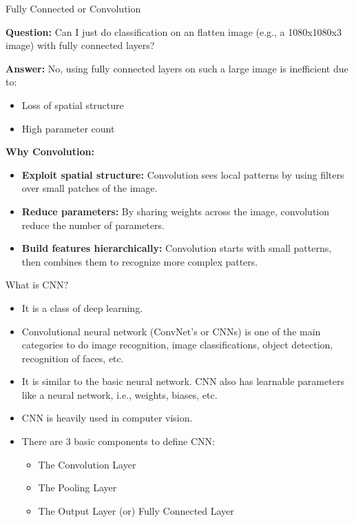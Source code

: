 \documentclass[serif, aspectratio=169]{beamer}
\begin{document}
	\begin{frame}{Fully Connected or Convolution}
		
		\textbf{Question:}
		Can I just do classification on an flatten image (e.g., a 1080x1080x3 image) with fully connected layers?
		
		\bigskip
		
		\textbf{Answer:} 
		No, using fully connected layers on such a large image is inefficient due to:
		\begin{itemize}
			\item Loss of spatial structure
			\item High parameter count
		\end{itemize}
		
		\bigskip
		
		\textbf{Why Convolution:}
			\begin{itemize}
				\item \textbf{Exploit spatial structure:} Convolution sees local patterns by using filters over small patches of the image.
				\item \textbf{Reduce parameters:} By sharing weights across the image, convolution reduce the number of parameters.
				\item \textbf{Build features hierarchically:} Convolution starts with small patterns, then combines them to recognize more complex patters.
			\end{itemize}
		
	\end{frame}	
	\begin{frame}{What is CNN?}
		\begin{itemize}
			\item It is a class of deep learning.
			
			\item Convolutional neural network (ConvNet’s or CNNs) is one of the main categories to do image recognition, image classifications, object detection, recognition of faces, etc.
			
			\item It is similar to the basic neural network. CNN also has learnable parameters like a neural network, i.e., weights, biases, etc.
			
			\item CNN is heavily used in computer vision.
			
			\item There are 3 basic components to define CNN:
			\begin{itemize}
				\item The Convolution Layer
				\item The Pooling Layer
				\item The Output Layer (or) Fully Connected Layer
			\end{itemize}
		\end{itemize}
		
	\end{frame}
\end{document}
